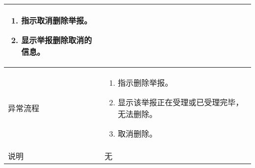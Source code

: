 \begin{table}[htbp]
\begin{tabular}{|l|l|l|l|}
{        \begin{minipage}[t]{0.8\textwidth}
                \begin{enumerate}[nosep]
                    \item 指示取消删除举报。
                    \item 显示举报删除取消的信息。
                          \vspace{0.5em}
                \end{enumerate}
            \end{minipage}  }                                                                                                                                                                                    \\
        \hline
        异常流程                          & \multicolumn{3}{l|}{ \begin{minipage}[t]{0.8\textwidth}
                \begin{enumerate}[nosep]
                    \item 指示删除举报。
                    \item 显示该举报正在受理或已受理完毕，无法删除。
                    \item 取消删除。
                          \vspace{0.5em}
                \end{enumerate}
            \end{minipage}}                                                                                                                             \\
        \hline
        说明                              & \multicolumn{3}{l|}{无    }                                                                                                                                                  \\
        \hline
    \end{tabular}
\end{table}


